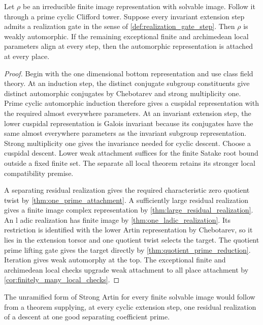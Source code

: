 \begin{theorem}\label{thm:gates_imply_solvable_artin}
Let \(\rho\) be an irreducible finite image representation with solvable image. Follow it through a prime cyclic Clifford tower. Suppose every invariant extension step admits a realization gate in the sense of \cref{def:realization_gate_step}. Then \(\rho\) is weakly automorphic. If the remaining exceptional finite and archimedean local parameters align at every step, then the automorphic representation is attached at every place.
\end{theorem}

\begin{proof}
Begin with the one dimensional bottom representation and use class field theory. At an induction step, the distinct conjugate subgroup constituents give distinct automorphic conjugates by Chebotarev and strong multiplicity one. Prime cyclic automorphic induction therefore gives a cuspidal representation with the required almost everywhere parameters. At an invariant extension step, the lower cuspidal representation is Galois invariant because its conjugates have the same almost everywhere parameters as the invariant subgroup representation. Strong multiplicity one gives the invariance needed for cyclic descent. Choose a cuspidal descent. Lower weak attachment suffices for the finite Satake root bound outside a fixed finite set. The separate all local theorem retains its stronger local compatibility premise.

A separating residual realization gives the required characteristic zero quotient twist by \cref{thm:one_prime_attachment}. A sufficiently large residual realization gives a finite image complex representation by \cref{thm:large_residual_realization}. An l adic realization has finite image by \cref{thm:one_ladic_realization}. Its restriction is identified with the lower Artin representation by Chebotarev, so it lies in the extension torsor and one quotient twist selects the target. The quotient prime lifting gate gives the target directly by \cref{thm:quotient_prime_reduction}. Iteration gives weak automorphy at the top. The exceptional finite and archimedean local checks upgrade weak attachment to all place attachment by \cref{cor:finitely_many_local_checks}.
\end{proof}

\begin{corollary}\label{cor:single_residual_target}
The unramified form of Strong Artin for every finite solvable image would follow from a theorem supplying, at every cyclic extension step, one residual realization of a descent at one good separating coefficient prime.
\end{corollary}

